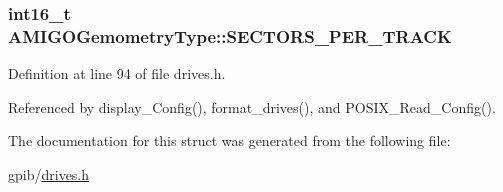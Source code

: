 \subsubsection[{\texorpdfstring{S\+E\+C\+T\+O\+R\+S\+\_\+\+P\+E\+R\+\_\+\+T\+R\+A\+CK}{SECTORS_PER_TRACK}}]{\setlength{\rightskip}{0pt plus 5cm}int16\+\_\+t A\+M\+I\+G\+O\+Gemometry\+Type\+::\+S\+E\+C\+T\+O\+R\+S\+\_\+\+P\+E\+R\+\_\+\+T\+R\+A\+CK}\hypertarget{structAMIGOGemometryType_a9ac647c76bd331ab5b1fd22a4f5b9a4a}{}\label{structAMIGOGemometryType_a9ac647c76bd331ab5b1fd22a4f5b9a4a}


Definition at line 94 of file drives.\+h.



Referenced by display\+\_\+\+Config(), format\+\_\+drives(), and P\+O\+S\+I\+X\+\_\+\+Read\+\_\+\+Config().



The documentation for this struct was generated from the following file\+:\begin{DoxyCompactItemize}
\item 
gpib/\hyperlink{drives_8h}{drives.\+h}\end{DoxyCompactItemize}
